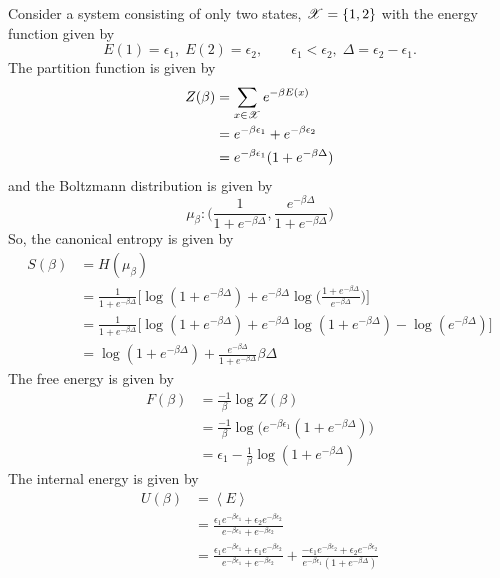 \documentclass[letterpaper,english,12pt]{article}
\begin{document}
\begin{exmp}
Consider a system consisting of only two states, $\mathscr{X} = \{ 1, 2 \}$ with the energy function given by
$$ E(1) = \epsilon_1,\; E(2) = \epsilon_2, \qquad \epsilon_1 < \epsilon_2,\; \Delta = \epsilon_2 - \epsilon_1.$$
The partition function is given by
\begin{align}
Z(\beta) &= \sum_{x \in \mathscr{X}} e^{-\beta E(x)} \nonumber \\
	&= e^{-\beta \epsilon_1} + e^{-\beta \epsilon_2} \nonumber \\
	&= e^{-\beta \epsilon_1}(1 + e^{-\beta \Delta})
\end{align}
and the Boltzmann distribution is given by
$$\mu_\beta : \Big( \frac{1}{1 + e^{-\beta \Delta}}, \frac{e^{-\beta \Delta}}{1 + e^{-\beta \Delta}} \Big)$$
So, the canonical entropy is given by
\begin{align}
S(\beta) &= H(\mu_\beta) \nonumber \\
	&= \frac{1}{1 + e^{-\beta \Delta}} \Bigg[ \log(1 + e^{-\beta \Delta}) + e^{-\beta \Delta} \log\bigg(\frac{1 + e^{-\beta \Delta}}{e^{-\beta \Delta}}\bigg)\Bigg] \nonumber \\
	&= \frac{1}{1 + e^{-\beta \Delta}} \Bigg[ \log(1 + e^{-\beta \Delta}) + e^{-\beta \Delta} \log(1 + e^{-\beta \Delta}) - \log (e^{-\beta \Delta})\Bigg] \nonumber \\
	&= \log(1 + e^{-\beta \Delta}) + \frac{e^{-\beta \Delta}}{1 + e^{-\beta \Delta}} \beta \Delta
\end{align}
The free energy is given by
\begin{align}
F(\beta) &= \frac{-1}{\beta} \log Z(\beta) \nonumber \\
	&= \frac{-1}{\beta} \log \bigg( e^{-\beta \epsilon_1}(1 + e^{-\beta \Delta})\bigg) \nonumber \\
	&= \epsilon_1 - \frac{1}{\beta} \log(1 + e^{-\beta \Delta})
\end{align}
The internal energy is given by
\begin{align}
U(\beta) &= \left\langle E \right\rangle \nonumber \\
	&= \frac{\epsilon_1 e^{-\beta \epsilon_1} + \epsilon_2 e^{-\beta \epsilon_2}}{e^{-\beta \epsilon_1} + e^{-\beta \epsilon_2}} \nonumber \\
	&= \frac{\epsilon_1 e^{-\beta \epsilon_1} + \epsilon_1 e^{-\beta \epsilon_2}}{e^{-\beta \epsilon_1} + e^{-\beta \epsilon_2}} + \frac{-\epsilon_1 e^{-\beta \epsilon_2} + \epsilon_2 e^{-\beta \epsilon_2}}{e^{-\beta \epsilon_1}(1 + e^{-\beta \Delta})} \nonumber \\

\end{align}
\end{exmp}
\end{document}
